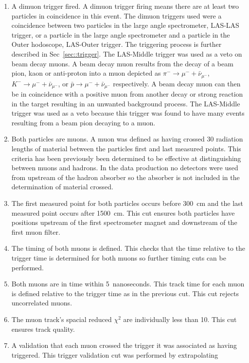 \begin{enumerate}
\item A dimuon trigger fired.  A dimuon trigger firing means there are at least
  two particles in coincidence in this event. The dimuon triggers used were a
  coincidence between two particles in the large angle spectrometer, LAS-LAS
  trigger, or a particle in the large angle spectrometer and a particle in the
  Outer hodoscope, LAS-Outer trigger.  The triggering process is further
  described in Sec~\ref{sec::trigger}.  The LAS-Middle trigger was used as a
  veto on beam decay muons.  A beam decay muon results from the decay of a beam
  pion, kaon or anti-proton into a muon depicted as $\pi^- \rightarrow \mu^- +
  \bar{\nu}_{\mu^-}$, $K^- \rightarrow \mu^- + \bar{\nu}_{\mu^-}$, or $\bar{p}
  \rightarrow \mu^- + \bar{\nu}_{\mu^-}$ respectively.  A beam decay muon can
  then be in coincidence with a positive muon from another decay or strong
  reaction in the target resulting in an unwanted background process.  The
  LAS-Middle trigger was used as a veto because this trigger was found to have
  many events resulting from a beam pion decaying to a muon.
\item Both particles are muons.  A muon was defined as having crossed 30
  radiation lengths of material between the particles first and last measured
  points.  This criteria has been previously been determined to be effective at
  distinguishing between muons and hadrons.  In the data production no
  detectors were used from upstream of the hadron absorber so the absorber is
  not included in the determination of material crossed.
\item The first measured point for both particles occurs before 300~cm and the
  last measured point occurs after 1500~cm.  This cut ensures both particles
  have positions upstream of the first spectrometer magnet and downstream of the
  first muon filter.
\item The timing of both muons is defined.  This checks that the time relative
  to the trigger time is determined for both muons so further timing cuts can be
  performed.
\item Both muons are in time within 5~nanoseconds.  This track time for each
  muon is defined relative to the trigger time as in the previous cut.  This cut
  rejects uncorrelated muons.
\item The muon track's spacial reduced $\chi^2$ are individually less than 10.
  This cut ensures track quality.
\item A validation that each muon crossed the trigger it was associated as
  having triggered.  This trigger validation cut was performed by extrapolating

\end{enumerate}
